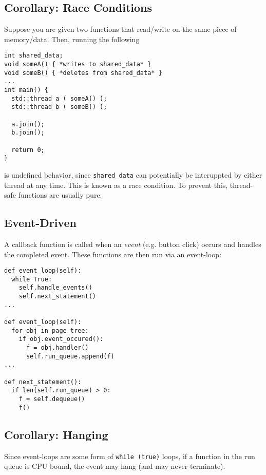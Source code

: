 \documentclass{article}
\begin{document}
\subsection*{Corollary: Race Conditions}
Suppose you are given two functions that read/write on the same piece of
memory/data. Then, running the following
\begin{verbatim}
int shared_data;
void someA() { *writes to shared_data* }
void someB() { *deletes from shared_data* }
...
int main() {
  std::thread a ( someA() );
  std::thread b ( someB() );

  a.join();
  b.join();

  return 0;
}
\end{verbatim}
is undefined behavior, since \texttt{shared\_data} can potentially be
interuppted by either thread at any time. This is known as a race
condition. To prevent this, thread-safe functions are usually pure.

\subsection{Event-Driven}
A callback function is called when an \textit{event} (e.g. button click) occurs
and handles the completed event. These functions are then run via an
event-loop:

\begin{verbatim}
def event_loop(self):
  while True:
    self.handle_events()
    self.next_statement()
...

def event_loop(self):
  for obj in page_tree:
    if obj.event_occured():
      f = obj.handler()
      self.run_queue.append(f)
...

def next_statement():
  if len(self.run_queue) > 0:
    f = self.dequeue()
    f()
\end{verbatim}

\subsection*{Corollary: Hanging}
Since event-loops are some form of \texttt{while (true)} loops, if a
function in the run queue is CPU bound, the event may hang (and may
never terminate).
\end{document}
